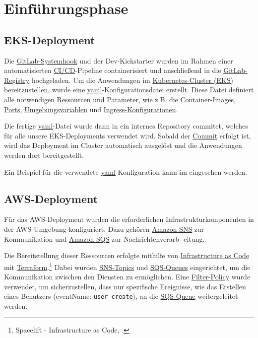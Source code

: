 \section{Einführungsphase}
\label{sec:Einfuehrungsphase}

\subsection{EKS-Deployment}
\label{sec:EKSDeployment}

Die \hyperlink{GitLabSystemhooks}{\textcolor{AOBlau}{GitLab-Systemhook}} und der Dev-Kickstarter wurden im Rahmen einer automatisierten \hyperlink{CI}{\textcolor{AOBlau}{CI/CD}}-Pipeline containerisiert und anschließend in die \hyperlink{GitLab}{\textcolor{AOBlau}{GitLab-Registry}} hochgeladen. Um die Anwendungen im \hyperlink{EKS}{\textcolor{AOBlau}{Kubernetes-Cluster (EKS)}} bereitzustellen, wurde eine \hyperlink{YAML}{\textcolor{AOBlau}{yaml}}-Konfigurationsdatei erstellt. Diese Datei definiert alle notwendigen Ressourcen und Parameter, wie z.B. die \hyperlink{ContainerImage}{\textcolor{AOBlau}{Container-Images}}, \hyperlink{Ports}{\textcolor{AOBlau}{Ports}}, \hyperlink{Umgebungsvariablen}{\textcolor{AOBlau}{Umgebungsvariablen}} und \hyperlink{KubernetesIngress}{\textcolor{AOBlau}{Ingress-Konfigurationen}}.

Die fertige \hyperlink{GitCommit}{\textcolor{AOBlau}{yaml}}-Datei wurde dann in ein internes Repository commitet, welches für alle unsere EKS-Deployments verwendet wird. Sobald der \hyperlink{GitCommit}{\textcolor{AOBlau}{Commit}} erfolgt ist, wird das Deployment im Cluster automatisch ausgelöst und die Anwendungen werden dort bereitgestellt. 

Ein Beispiel für die verwendete \hyperlink{YAML}{\textcolor{AOBlau}{yaml}}-Konfiguration kann im  eingesehen werden.

\subsection{AWS-Deployment}
\label{sec:AWSDeployment}

Für das AWS-Deployment wurden die erforderlichen Infrastrukturkomponenten in der AWS-Umgebung konfiguriert. Dazu gehören \hyperlink{SNS}{\textcolor{AOBlau}{Amazon SNS}} zur Kommunikation und \hyperlink{SQS}{\textcolor{AOBlau}{Amazon SQS}} zur Nachrichtenverarb-
eitung. 

Die Bereitstellung dieser Ressourcen erfolgte mithilfe von \hyperlink{InfrastructureAsCode}{\textcolor{AOBlau}{Infrastructure as Code}} mit \hyperlink{Terraform}{\textcolor{AOBlau}{Terraform}}.\footnote{Spacelift - Infrastructure as Code, \cite{Iac}.} Dabei wurden \hyperlink{SNS}{\textcolor{AOBlau}{SNS-Topics}} und \hyperlink{SQS}{\textcolor{AOBlau}{SQS-Queues}} eingerichtet, um die Kommunikation zwischen den Diensten zu ermöglichen. Eine \hyperlink{FilterPolicies}{\textcolor{AOBlau}{Filter-Policy}} wurde verwendet, um sicherzustellen, dass nur spezifische Ereignisse, wie das Erstellen eines Benutzers (eventName: \texttt{user\_create}), an die \hyperlink{SQS}{\textcolor{AOBlau}{SQS-Queue}} weitergeleitet werden. 

